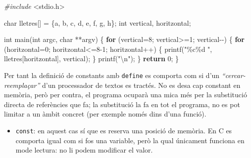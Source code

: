\documentclass[
]{book}
\newenvironment{Shaded}{\begin{snugshade}}{\end{snugshade}}
\newcommand{\CharTok}[1]{\textcolor[rgb]{0.31,0.60,0.02}{#1}}
\newcommand{\ControlFlowTok}[1]{\textcolor[rgb]{0.13,0.29,0.53}{\textbf{#1}}}
\newcommand{\DataTypeTok}[1]{\textcolor[rgb]{0.13,0.29,0.53}{#1}}
\newcommand{\DecValTok}[1]{\textcolor[rgb]{0.00,0.00,0.81}{#1}}
\newcommand{\ImportTok}[1]{#1}
\newcommand{\NormalTok}[1]{#1}
\newcommand{\PreprocessorTok}[1]{\textcolor[rgb]{0.56,0.35,0.01}{\textit{#1}}}
\newcommand{\SpecialCharTok}[1]{\textcolor[rgb]{0.00,0.00,0.00}{#1}}
\newcommand{\StringTok}[1]{\textcolor[rgb]{0.31,0.60,0.02}{#1}}
\providecommand{\tightlist}{%
  \setlength{\itemsep}{0pt}\setlength{\parskip}{0pt}}
\begin{document}
\begin{Shaded}
\begin{Highlighting}[]
\PreprocessorTok{\#include }\ImportTok{\textless{}stdio.h\textgreater{}}

\DataTypeTok{char}\NormalTok{ lletres[] = \{}\CharTok{\textquotesingle{}a\textquotesingle{}}\NormalTok{, }\CharTok{\textquotesingle{}b\textquotesingle{}}\NormalTok{, }\CharTok{\textquotesingle{}c\textquotesingle{}}\NormalTok{, }\CharTok{\textquotesingle{}d\textquotesingle{}}\NormalTok{, }\CharTok{\textquotesingle{}e\textquotesingle{}}\NormalTok{, }\CharTok{\textquotesingle{}f\textquotesingle{}}\NormalTok{, }\CharTok{\textquotesingle{}g\textquotesingle{}}\NormalTok{, }\CharTok{\textquotesingle{}h\textquotesingle{}}\NormalTok{\};}
\DataTypeTok{int}\NormalTok{ vertical, horitzontal;}

\DataTypeTok{int}\NormalTok{ main(}\DataTypeTok{int}\NormalTok{ argc, }\DataTypeTok{char}\NormalTok{ **argv) \{}
    \ControlFlowTok{for}\NormalTok{ (vertical=}\DecValTok{8}\NormalTok{; vertical\textgreater{}=}\DecValTok{1}\NormalTok{; vertical{-}{-}) \{}
        \ControlFlowTok{for}\NormalTok{ (horitzontal=}\DecValTok{0}\NormalTok{; horitzontal\textless{}=}\DecValTok{8}\NormalTok{{-}}\DecValTok{1}\NormalTok{; horitzontal++) \{}
\NormalTok{            printf(}\StringTok{"\%c\%d "}\NormalTok{, lletres[horitzontal], vertical);}
\NormalTok{        \}}
\NormalTok{        printf(}\StringTok{"}\SpecialCharTok{\textbackslash{}n}\StringTok{"}\NormalTok{);}
\NormalTok{    \}}
    \ControlFlowTok{return} \DecValTok{0}\NormalTok{;}
\NormalTok{\}}
\end{Highlighting}
\end{Shaded}

Per tant la definició de constants amb \texttt{define} es comporta com si d'un \emph{``cercar-reemplaçar''} d'un processador de textos es tractés. No es desa cap constant en memòria, però per contra, el programa ocuparà una mica més per la substitució directa de referències que fa; la substitució la fa en tot el programa, no es pot limitar a un àmbit concret (per exemple només dins d'una funció).

\begin{itemize}
\tightlist
\item
  \texttt{const}: en aquest cas sí que es reserva una posició de memòria. En C es comporta igual com si fos una variable, però la qual únicament funciona en mode lectura: no li podem modificar el valor.
\end{itemize}
\end{document}
